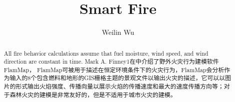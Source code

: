 \documentclass{ctexart}
\title{Smart Fire}
\author{Weilin Wu}
\begin{document}
\maketitle

\begin{abstract}
All fire behavior calculations assume that fuel moisture, wind speed,
and wind direction are constant in time. \cite{finney_overview_2006}
Mark A. Finney1在\cite{finney_overview_2006}中介绍了野外火灾行为建模软件FlamMap，
FlamMap可被用于描述在恒定环境条件下的火灾行为，FlamMap会分析作为输入的8个包含燃料和地形的GIS栅格主题的景观文件以输出火灾的描述，它可以以图片的形式输出火焰强度、传播向量以展示火焰的传播速度和最大的速度传播方向等；对于森林火灾的建模是非常友好的，但是不适用于城市火灾的建模。

\end{abstract}

\section{}


\end{document}
